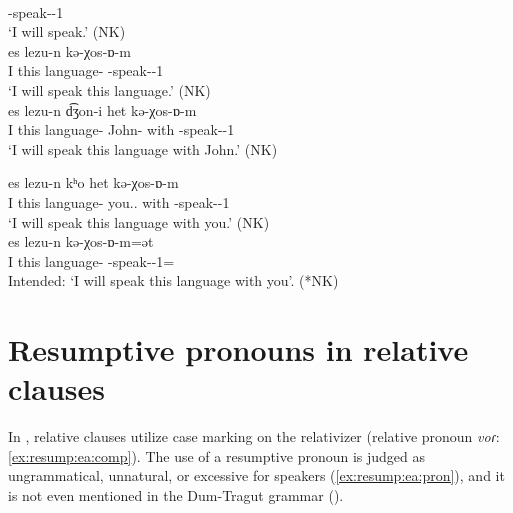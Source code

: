 \begin{exe}
	\ex 
	\begin{xlist}
		\ex {}  
		\\
		{\fut}-speak-{\thgloss}-1{\sg}
		\\
		\trans	`I {will} speak.' \hfill (NK)
		\\
		\ex {} {es} {lezu-n}  {kə-χos-ɒ-m} 
		\\
		I this language-{} {\fut}-speak-{\thgloss}-1{\sg}
		\\
		\trans	`I {will} speak this language.' \hfill (NK)
		\\
		\ex {} {es} {lezu-n}  {d͡ʒon-i} {het} {kə-χos-ɒ-m} 
		\\
		I this language-{} John-{\gen} with {\fut}-speak-{\thgloss}-1{\sg}
		\\
		\trans	`I {will} speak this language with John.' \hfill (NK)
		\\
		
		\ex {} {es} {lezu-n}  {kʰo}  {het} {kə-χos-ɒ-m}  
		\\
		I this language-{} you.{\sg}.{\gen} with {\fut}-speak-{\thgloss}-1{\sg}
		\\
		\trans	`I {will} speak this language with you.' \hfill (NK)
		\\
		\ex {} {es} {lezu-n}  {kə-χos-ɒ-m=ət} 
		\\
		I this language-{} {\fut}-speak-{\thgloss}-1{\sg}={\possSsg}
		\\
		\trans	Intended:  `I {will} speak this language with you’. \label{ex:syntax:xosamet}\hfill   (*NK)
		
	\end{xlist}
\end{exe}
\section{Resumptive pronouns in relative clauses}\label{section:syntax:resumptive}

In {\seaSEA}, relative clauses   utilize   case marking on the relativizer (relative pronoun \textit{voɾ}:  \ref{ex:resump:ea:comp}). The use of a resumptive pronoun is judged as ungrammatical, unnatural, or excessive for speakers (\ref{ex:resump:ea:pron}),   and it is not even mentioned in the Dum-Tragut grammar (\citeyear[478]{DumTragut-2009-ArmenianReferenceGrammar}).  


